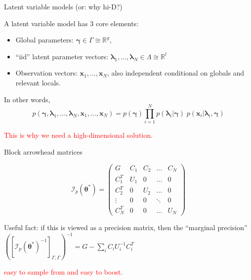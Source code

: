 \documentclass[
  ignorenonframetext,
]{beamer}
\providecommand{\tightlist}{%
  \setlength{\itemsep}{0pt}\setlength{\parskip}{0pt}}
\begin{document}
\begin{frame}{Latent variable models (or: why hi-D?)}
\protect\hypertarget{latent-variable-models-or-why-hi-d}{}

A latent variable model has 3 core elements:

\begin{itemize}
\tightlist
\item
  Global parameters: \(\bm{\gamma}\in\Gamma \cong \mathbb{R}^g\),
\item
  ``iid'' latent parameter vectors:
  \(\bm{\lambda}_1,\dots,\bm{\lambda}_N\in\Lambda \cong \mathbb{R}^l\)
\item
  Observation vectors: \(\bm{x}_1,\dots,\bm{x}_N\), also independent
  conditional on globals and relevant locals.
\end{itemize}

In other words,
\[p\left(\bm{\gamma}, \bm{\lambda}_1,\dots,\bm{\lambda}_N,\bm{x}_1,\dots,\bm{x}_N\right) = p(\bm{\gamma})\prod_{i=1}^N p(\bm{\lambda}_i|\bm{\gamma})\; p(\bm{x}_i|\bm{\lambda}_i,\bm{\gamma})\]

\textcolor{red}{{\scriptsize This is why we need a high-dimensional solution.}}

\end{frame}

\begin{frame}{Block arrowhead matrices}
\protect\hypertarget{block-arrowhead-matrices}{}

\[\mathcal{I}_p(\bm{\theta}^*) = \left(\begin{array}{ccccc}
    G & C_1 & C_2 & \dots & C_N \\
    C_1^T & U_1 & 0 & \dots & 0 \\
    C_2^T & 0 & U_2 & \dots & 0 \\
    \vdots & 0 & 0 & \ddots & 0 \\
    C_N^T & 0 & 0 & \dots & U_N
    \end{array}\right)\]

Useful fact: if this is viewed as a precision matrix, then the
``marginal precision''
\(([\mathcal{I}_p(\bm{\theta}^*)^{-1}]_{\Gamma,\Gamma})^{-1}=G-\sum_i C_iU_i^{-1}C_i^T\)

\textcolor{red}{{\scriptsize easy to sample from and easy to boost.}}

\end{frame}
\end{document}
